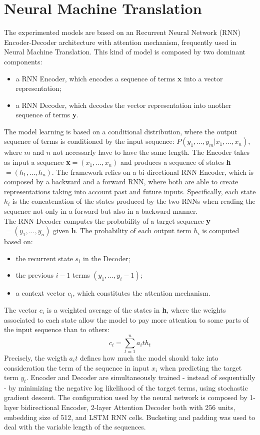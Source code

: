 
\section{Neural Machine Translation}
The experimented models are based on an Recurrent Neural Network (RNN) Encoder-Decoder
architecture with attention mechanism, frequently used in Neural Machine Translation. This kind of model is composed by two
dominant components:

\begin{itemize}
    \item a RNN Encoder, which encodes a sequence of terms \textbf{x} into a vector representation;
    \item a RNN Decoder, which decodes the vector representation into another sequence of terms \textbf{y}.
\end{itemize}

The model learning is based on a conditional distribution, where the output sequence of terms is conditioned
by the input sequence: \(P(y_1,...,y_m|x_1,...,x_n)\), where \(m\) and \(n\) not necessarly have to have the same length.
The Encoder takes as input a sequence \textbf{x}\(= (x_1,...,x_n)\) and produces
a sequence of states \textbf{h}\(= (h_1,...,h_n)\). The framework relies on a bi-directional
RNN Encoder, which is composed by a backward and a forward RNN, where both are able to create representations taking into account
past and future inputs. Specifically, each state \(h_i\) is the concatenation of the states produced by 
the two RNNs when reading the sequence not only in a forward but also in a backward manner.\\
The RNN Decoder computes the probability of a target sequence \textbf{y}\(= (y_1,...,y_n)\) given \textbf{h}. The probability
of each output term \(h_i\) is computed based on:
\begin{itemize}
    \item the recurrent state \(s_i\) in the Decoder;
    \item the previous \(i - 1\) terms \((y_1,...,y_i-1)\);
    \item a context vector \(c_i\), which constitutes the attention mechanism.
\end{itemize}
The vector \(c_i\) is a weighted average of the states in \textbf{h}, where the weights associated 
to each state allow the model to pay more attention to some parts of the input sequence than to others:
\[c_i = \sum_{t=1}^n a_it h_t\]
Precisely, the weigth \(a_it\) defines how much the model should take into consideration the term of the sequence in input \(x_i\)
when predicting the target term \(y_t\). Encoder and Decoder are simultaneously trained - instead of sequentially - by minimizing
the negative log likelihood of the target terms, using stochastic gradient descent.
The configuration used by the neural network is composed by 1-layer bidirectional Encoder, 
2-layer Attention Decoder both with 256 units, embedding size of 512, 
and LSTM RNN cells. Bucketing and padding was used to deal with the variable length of the sequences.


